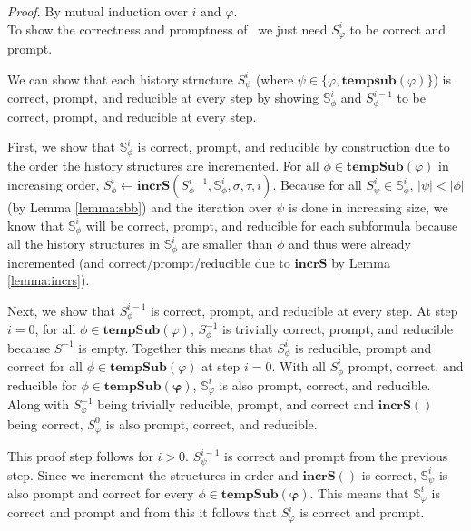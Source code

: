 \textit{Proof.} By mutual induction over $i$ and $\varphi$. \\
To show the correctness and promptness of \agmon\ we just need $S^i_{\varphi}$ to be correct and prompt.

We can show that each history structure $S^i_{\psi}$ (where $\psi \in \{\varphi, \mathbf{tempsub}(\varphi)\}$) is correct, prompt, and reducible at every step by showing $\mathbb{S}^i_{\phi}$ and $S^{i-1}_{\phi}$ to be correct, prompt, and reducible at every step. 

First, we show that $\mathbb{S}^i_{\phi}$ is correct, prompt, and reducible by construction due to the order the history structures are incremented.
%
For all $\phi \in \mathbf{tempSub}(\varphi)$ in increasing order, $S^i_\phi \leftarrow \mathbf{incrS}(S^{i-1}_\phi, \mathbb{S}^i_\phi, \sigma, \tau, i)$. 
Because for all $S^i_{\psi} \in \mathbb{S}^i_\phi$, $|\psi| < |\phi|$ (by Lemma \ref{lemma:sbb}) and the iteration over $\psi$ is done in increasing size, we know that $\mathbb{S}^i_{\phi}$ will be correct, prompt, and reducible for each subformula because all the history structures in $\mathbb{S}^i_{\phi}$ are smaller than $\phi$ and thus were already incremented (and correct/prompt/reducible due to $\mathbf{incrS}$ by Lemma \ref{lemma:incrs}). 

Next, we show that $S^{i-1}_{\phi}$ is correct, prompt, and reducible at every step.
At step $i=0$, for all $\phi \in \mathbf{tempSub}(\varphi)$, $S^{-1}_{\phi}$ is trivially correct, prompt, and reducible because $S^{-1}$ is empty. 
%
Together this means that $S^i_\phi$ is reducible, prompt and correct for all $\phi \in \mathbf{tempSub}(\varphi)$ at step $i=0$.
%
With all $S^i_\phi$ prompt, correct, and reducible for $\phi \in \mathbf{tempSub(\varphi)}$, $\mathbb{S}^i_{\varphi}$ is also prompt, correct, and reducible. Along with $S^{-1}_\varphi$ being trivially reducible, prompt, and correct and $\mathbf{incrS()}$ being correct, $S^0_\varphi$ is also prompt, correct, and reducible.

This proof step follows for $i>0$. $S^{i-1}_\psi$ is correct and prompt from the previous step. Since we increment the structures in order and $\mathbf{incrS()}$ is correct, $\mathbb{S}^i_{\psi}$ is also prompt and correct for every $\phi \in \mathbf{tempSub(\varphi)}$. This means that $\mathbb{S}^i_{\varphi}$ is correct and prompt and from this it follows that $S^i_\varphi$ is correct and prompt.

